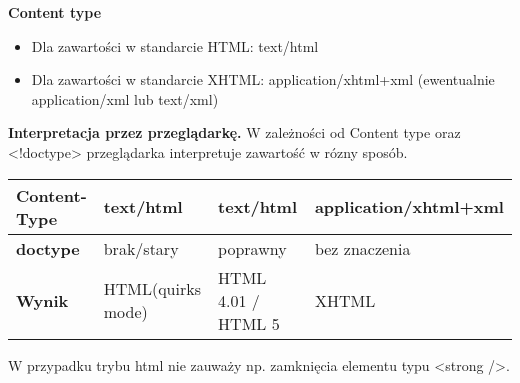 \documentclass[../main.tex]{subfiles}
\begin{document}
    \textbf{Content type}
    \begin{itemize}
        \item Dla zawartości w standarcie HTML: text/html
        \item Dla zawartości w standarcie XHTML: application/xhtml+xml (ewentualnie application/xml lub text/xml)
    \end{itemize}

    \textbf{Interpretacja przez przeglądarkę.}
    W zależności od Content type oraz <!doctype> przeglądarka interpretuje zawartość w rózny sposób.

    \begin{table}[H]
        \begin{center}
            \begin{tabular}{|p{4cm}|p{4cm}|p{4cm}|p{4cm}|}
                \hline
                \textbf{Content-Type} & text/html & text/html & application/xhtml+xml\\
                \hline
                \textbf{doctype} & brak/stary & poprawny & bez znaczenia\\
                \hline
                \textbf{Wynik} & HTML(quirks mode) & HTML 4.01 / HTML 5 & XHTML\\
                \hline
            \end{tabular}
        \end{center}
    \end{table}
    W przypadku trybu html nie zauważy np. zamknięcia elementu typu <strong />.
\end{document}
